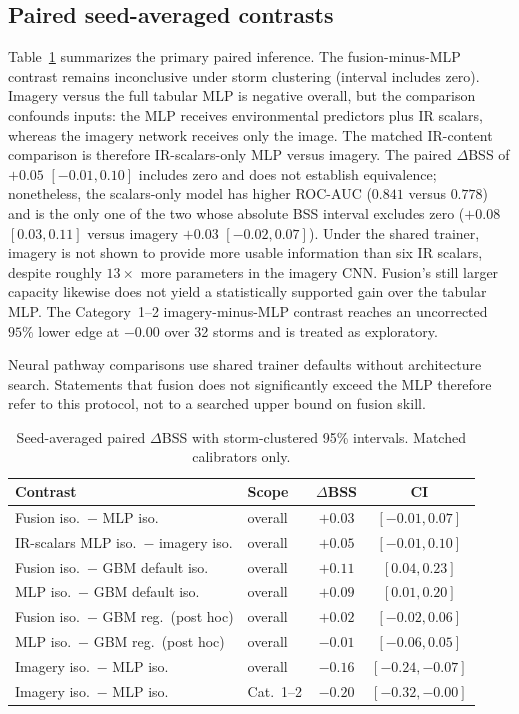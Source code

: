 \documentclass[11pt]{article}
\begin{document}
\subsection{Paired seed-averaged contrasts}

Table~\ref{tab:paired} summarizes the primary paired inference. The fusion-minus-MLP contrast remains inconclusive under storm clustering (interval includes zero). Imagery versus the full tabular MLP is negative overall, but the comparison confounds inputs: the MLP receives environmental predictors plus IR scalars, whereas the imagery network receives only the image. The matched IR-content comparison is therefore IR-scalars-only MLP versus imagery. The paired $\Delta$BSS of $+0.05$ $[-0.01,0.10]$ includes zero and does not establish equivalence; nonetheless, the scalars-only model has higher ROC-AUC ($0.841$ versus $0.778$) and is the only one of the two whose absolute BSS interval excludes zero ($+0.08$ $[0.03,0.11]$ versus imagery $+0.03$ $[-0.02,0.07]$). Under the shared trainer, imagery is not shown to provide more usable information than six IR scalars, despite roughly $13\times$ more parameters in the imagery CNN. Fusion's still larger capacity likewise does not yield a statistically supported gain over the tabular MLP. The Category~1--2 imagery-minus-MLP contrast reaches an uncorrected $95\%$ lower edge at $-0.00$ over 32 storms and is treated as exploratory.

Neural pathway comparisons use shared trainer defaults without architecture search. Statements that fusion does not significantly exceed the MLP therefore refer to this protocol, not to a searched upper bound on fusion skill.

\begin{table}[H]
\centering
\caption{Seed-averaged paired $\Delta$BSS with storm-clustered 95\% intervals. Matched calibrators only.}
\label{tab:paired}
\begin{tabular}{llcc}
\toprule
Contrast & Scope & $\Delta$BSS & CI \\
\midrule
Fusion iso.\ $-$ MLP iso. & overall & $+0.03$ & $[-0.01,0.07]$ \\
IR-scalars MLP iso.\ $-$ imagery iso. & overall & $+0.05$ & $[-0.01,0.10]$ \\
Fusion iso.\ $-$ GBM default iso. & overall & $+0.11$ & $[0.04,0.23]$ \\
MLP iso.\ $-$ GBM default iso. & overall & $+0.09$ & $[0.01,0.20]$ \\
Fusion iso.\ $-$ GBM reg.\ (post hoc) & overall & $+0.02$ & $[-0.02,0.06]$ \\
MLP iso.\ $-$ GBM reg.\ (post hoc) & overall & $-0.01$ & $[-0.06,0.05]$ \\
Imagery iso.\ $-$ MLP iso. & overall & $-0.16$ & $[-0.24,-0.07]$ \\
Imagery iso.\ $-$ MLP iso. & Cat.~1--2 & $-0.20$ & $[-0.32,-0.00]$ \\
\bottomrule
\end{tabular}
\end{table}
\end{document}
